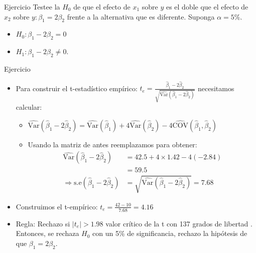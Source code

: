\documentclass{beamer}
\begin{document}
\begin{frame}{Ejercicio}
Testee la $H_0$ de que el efecto de $x_1$ sobre $y$ es el doble que el efecto de $x_2$ sobre $y:\beta_1=2\beta_2$ frente a la alternativa que es diferente. Suponga $\alpha=5\%$.
    \begin{itemize}
      
          \item $H_0: \beta_1 - 2\beta_2 = 0$
          \item $H_1: \beta_1 - 2\beta_2 \neq 0$.
  \end{itemize}
\end{frame}

\begin{frame}{Ejercicio}
  
   \begin{itemize}
      \item Para construir el t-estadístico empírico: $t_e = \frac{\hat{\beta}_1 - 2\hat{\beta}_2}{\sqrt{\hat{\text{Var}}(\hat{\beta}_1 - 2\hat{\beta}_2)}}$ necesitamos calcular:  
        \begin{itemize}
            \item $\hat{\text{Var}}(\hat{\beta}_1 - 2\hat{\beta}_2) = \hat{\text{Var}}(\hat{\beta}_1) + 4\hat{\text{Var}}(\hat{\beta}_2) - 4\hat{\text{COV}}(\hat{\beta}_1, \hat{\beta}_2)$
            \item Usando la matriz de antes reemplazamos para obtener:
            \begin{align*}
               \hat{ \text{Var}}(\hat{\beta}_1 - 2\hat{\beta}_2) &= 42.5 + 4 \times 1.42 - 4(-2.84) \\
                &= 59.5 \\
                \Rightarrow \text{s.e}(\hat{\beta}_1 - 2\hat{\beta}_2) &= \sqrt{\hat{\text{Var}}(\hat{\beta}_1 - 2\hat{\beta}_2)} = 7.68
            \end{align*}
        \end{itemize}
        \item Construimos el t-empírico: $t_e = \frac{42 - 10}{7.68} = 4.16$
        \item Regla: Rechazo si $|t_e| > 1.98$ valor crítico de  la t con 137 grados de libertad . Entonces, se rechaza $H_0$ con un 5\% de significancia, rechazo la hipótesis de que $\beta_1 = 2\beta_2$.  
   \end{itemize}
\end{frame}
\end{document}

